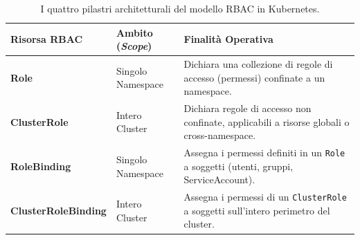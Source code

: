 \documentclass[11pt, a4paper]{article}
\begin{document}
\begin{table}[H]
\centering
\small
\begin{tabularx}{\textwidth}{l l X}
\toprule
\textbf{Risorsa RBAC} & \textbf{Ambito (\emph{Scope})} & \textbf{Finalità Operativa} \\
\midrule
\textbf{Role} & Singolo Namespace & Dichiara una collezione di regole di accesso (permessi) confinate a un namespace. \\
\addlinespace
\textbf{ClusterRole} & Intero Cluster & Dichiara regole di accesso non confinate, applicabili a risorse globali o cross-namespace. \\
\addlinespace
\textbf{RoleBinding} & Singolo Namespace & Assegna i permessi definiti in un \texttt{Role} a soggetti (utenti, gruppi, ServiceAccount). \\
\addlinespace
\textbf{ClusterRoleBinding} & Intero Cluster & Assegna i permessi di un \texttt{ClusterRole} a soggetti sull'intero perimetro del cluster. \\
\bottomrule
\end{tabularx}
\caption{I quattro pilastri architetturali del modello RBAC in Kubernetes.}
\label{tab:rbac_pillars}
\end{table}


\end{document}
